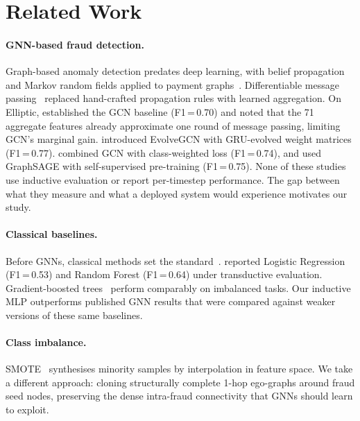 \documentclass[11pt]{article}
\begin{document}
\section{Related Work}
\label{sec:related}

\paragraph{GNN-based fraud detection.}
Graph-based anomaly detection predates deep learning, with belief
propagation and Markov random fields applied to payment
graphs~\citep{akoglu2015graph}.  Differentiable message
passing~\citep{gilmer2017mpnn} replaced hand-crafted propagation
rules with learned aggregation.  On Elliptic, \citet{weber2019}
established the GCN baseline (F1\,=\,0.70) and noted that the 71
aggregate features already approximate one round of message passing,
limiting GCN's marginal gain.  \citet{pareja2020evolvegcn} introduced
EvolveGCN with GRU-evolved weight matrices (F1\,=\,0.77).
\citet{alarab2020} combined GCN with class-weighted loss
(F1\,=\,0.74), and \citet{lo2023} used GraphSAGE with self-supervised
pre-training (F1\,=\,0.75).  None of these studies use inductive
evaluation or report per-timestep performance.  The gap between what
they measure and what a deployed system would experience motivates
our study.

\paragraph{Classical baselines.}
Before GNNs, classical methods set the
standard~\citep{hilal2022fraud}.  \citet{weber2019} reported Logistic
Regression (F1\,=\,0.53) and Random Forest (F1\,=\,0.64) under
transductive evaluation.  Gradient-boosted
trees~\citep{chen2016xgboost} perform comparably on imbalanced tasks.
Our inductive MLP outperforms published GNN results that were
compared against weaker versions of these same baselines.

\paragraph{Class imbalance.}
SMOTE~\citep{chawla2002smote} synthesises minority samples by
interpolation in feature space.  We take a different approach: cloning
structurally complete 1-hop ego-graphs around fraud seed nodes,
preserving the dense intra-fraud connectivity that GNNs should learn
to exploit.
\end{document}
